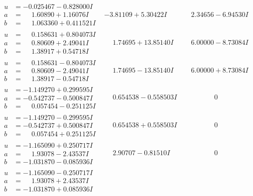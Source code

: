 \documentclass[1p]{elsarticle_modified}
\theoremstyle{definition}
\begin{document}
$$\begin{array}{c|c|c}
\begin{aligned}
u &= -0.025467 - 0.828000 I \\
a &= \phantom{-}1.60890 + 1.16076 I \\
b &= \phantom{-}1.063360 + 0.411521 I\end{aligned}
 & -3.81109 + 5.30422 I & \phantom{-}2.34656 - 6.94530 I \\ \hline\begin{aligned}
u &= \phantom{-}0.158631 + 0.804073 I \\
a &= \phantom{-}0.80609 + 2.49041 I \\
b &= \phantom{-}1.38917 + 0.54718 I\end{aligned}
 & \phantom{-}1.74695 + 13.85140 I & \phantom{-}6.00000 - 8.73084 I \\ \hline\begin{aligned}
u &= \phantom{-}0.158631 - 0.804073 I \\
a &= \phantom{-}0.80609 - 2.49041 I \\
b &= \phantom{-}1.38917 - 0.54718 I\end{aligned}
 & \phantom{-}1.74695 - 13.85140 I & \phantom{-}6.00000 + 8.73084 I \\ \hline\begin{aligned}
u &= -1.149270 + 0.299595 I \\
a &= -0.542737 - 0.500847 I \\
b &= \phantom{-}0.057454 - 0.251125 I\end{aligned}
 & \phantom{-}0.654538 - 0.558503 I & \phantom{-0.000000 } 0 \\ \hline\begin{aligned}
u &= -1.149270 - 0.299595 I \\
a &= -0.542737 + 0.500847 I \\
b &= \phantom{-}0.057454 + 0.251125 I\end{aligned}
 & \phantom{-}0.654538 + 0.558503 I & \phantom{-0.000000 } 0 \\ \hline\begin{aligned}
u &= -1.165090 + 0.250717 I \\
a &= \phantom{-}1.93078 - 2.43537 I \\
b &= -1.031870 - 0.085936 I\end{aligned}
 & \phantom{-}2.90707 - 0.81510 I & \phantom{-0.000000 } 0 \\ \hline\begin{aligned}
u &= -1.165090 - 0.250717 I \\
a &= \phantom{-}1.93078 + 2.43537 I \\
b &= -1.031870 + 0.085936 I\end{aligned}

\end{array}$$
\end{document}
